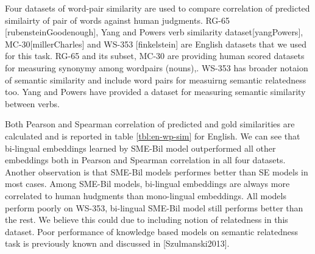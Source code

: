 \documentclass[11pt]{article}
\begin{document}
 Four datasets of word-pair similarity are used to compare correlation of
 predicted similairty of pair of words against human judgments.
 RG-65 [rubensteinGoodenough], Yang and Powers verb similarity
 dataset[yangPowers], MC-30[millerCharles] and WS-353 [finkelstein] are English
 datasets that we used for this task. RG-65 and its subset, MC-30 are providing
 human scored datasets for measuring synonymy among wordpairs (nouns),. WS-353
 has broader notaion of semantic similarity and include word pairs for measuirng semantic
 relatedness too. Yang and Powers have provided a dataset for measuring semantic
 similarity between verbs.
  
 
  
 Both Pearson and Spearman correlation of predicted and gold similarities 
 are calculated and is reported in table \ref{tbl:en-wp-sim} for English. We can
 see that bi-lingual embeddings learned by SME-Bil model outperformed all other
 embeddings both in Pearson and Spearman correlation in all four datasets.
 Another observation is that SME-Bil models performes better than SE
 models in most cases. Among SME-Bil models, bi-lingual embeddings are always
 more correlated to human hudgments than mono-lingual embeddings.
 All models perform poorly on WS-353, bi-lingual SME-Bil model still performs
 better than the rest. We believe this could due to including notion of
 relatedness in this dataset. Poor performance of knowledge based models on
 semantic relatedness task is previously known and discussed in
 [Szulmanski2013]. 
 
\end{document}
